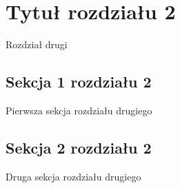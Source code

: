 \chapter{Tytuł rozdziału 2}

Rozdział drugi

\section{Sekcja 1 rozdziału 2}

Pierwsza sekcja rozdziału drugiego

\section{Sekcja 2 rozdziału 2}

Druga sekcja rozdziału drugiego
